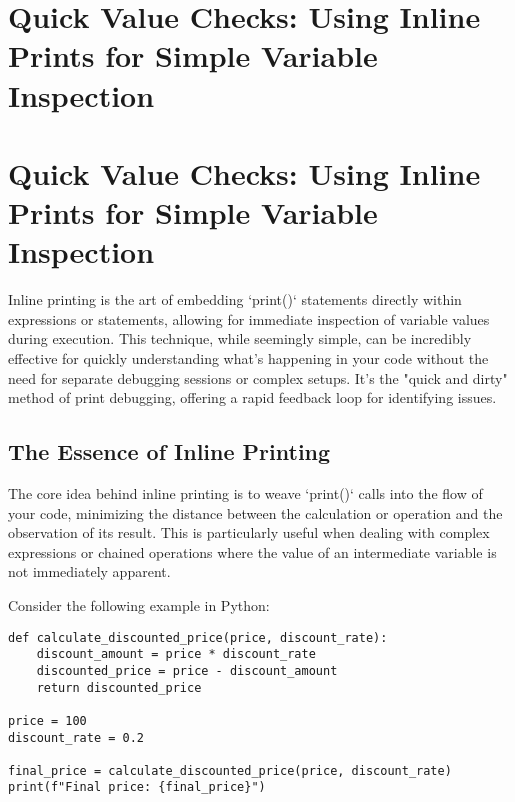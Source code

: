 \documentclass{article}
\begin{document}
{{{{%
\newpage

\section*{Quick Value Checks: Using Inline Prints for Simple Variable Inspection} %
\label{chapter-6-3-Quick_Value_Checks__Using_Inline_Prints}

\section*{Quick Value Checks: Using Inline Prints for Simple Variable Inspection}

Inline printing is the art of embedding `print()` statements directly within expressions or statements, allowing for immediate inspection of variable values during execution. This technique, while seemingly simple, can be incredibly effective for quickly understanding what's happening in your code without the need for separate debugging sessions or complex setups. It's the "quick and dirty" method of print debugging, offering a rapid feedback loop for identifying issues.

\subsection*{The Essence of Inline Printing}

The core idea behind inline printing is to weave `print()` calls into the flow of your code, minimizing the distance between the calculation or operation and the observation of its result. This is particularly useful when dealing with complex expressions or chained operations where the value of an intermediate variable is not immediately apparent.

Consider the following example in Python:

\begin{verbatim}
def calculate_discounted_price(price, discount_rate):
    discount_amount = price * discount_rate
    discounted_price = price - discount_amount
    return discounted_price

price = 100
discount_rate = 0.2

final_price = calculate_discounted_price(price, discount_rate)
print(f"Final price: {final_price}")
\end{verbatim}

}}}}
\end{document}
